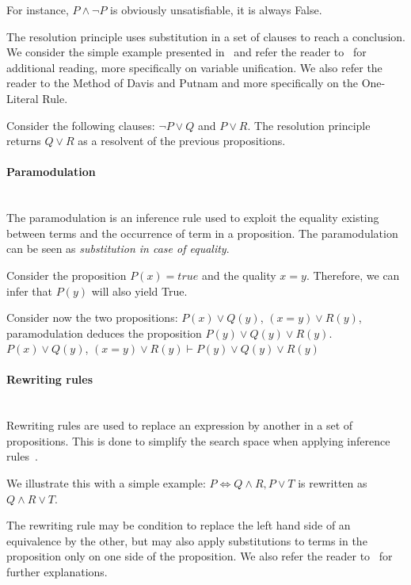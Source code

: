 For instance, $P \wedge \neg P$ is obviously unsatisfiable, \ie it is always False.

The resolution principle uses substitution in a set of clauses to reach a conclusion.
We consider the simple example presented in~\cite{snark-Stickel2000} and refer the reader to~\cite{symbolic-proof} for additional reading, more specifically on variable unification.
We also refer the reader to the Method of Davis and Putnam and more specifically on the One-Literal Rule.

Consider the following clauses: $\neg P \vee Q$ and $P \vee R$. The resolution principle returns $Q \vee R$ as a resolvent of the previous propositions.


\paragraph{Paramodulation}\textbf{\\}
The paramodulation is an inference rule used to exploit the equality existing between terms and the occurrence of term in a proposition. The paramodulation can be seen as \textit{substitution in case of equality}.

Consider the proposition $P(x) = true$ and the quality $x=y$. Therefore, we can infer that $P(y)$ will also yield True.

Consider now the two propositions: $P(x) \vee Q(y)$, $(x = y) \vee R(y)$, paramodulation deduces the proposition $P(y) \vee Q(y) \vee R(y)$.\\
$P(x) \vee Q(y)$, $(x = y) \vee R(y) \vdash P(y) \vee Q(y) \vee R(y)$

\paragraph{Rewriting rules}\textbf{\\}
Rewriting rules are used to replace an expression by another in a set of propositions.
This is done to simplify the search space when applying inference rules~\cite{snark-Stickel2000}.

We illustrate this with a simple example: $P \Leftrightarrow Q \wedge R, P \vee T$ is rewritten as $Q \wedge R \vee T$. 

The rewriting rule may be condition to replace the left hand side of an equivalence by the other, but may also apply substitutions to terms in the proposition only on one side of the proposition.
We also refer the reader to~\cite{snark-Stickel2000,symbolic-proof} for further explanations.
